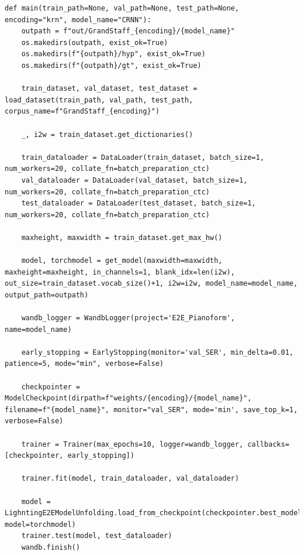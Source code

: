 \begin{lstlisting}[caption={Główna funkcja uczenia modelu}, label={model-main}]
def main(train_path=None, val_path=None, test_path=None, encoding="krn", model_name="CRNN"):
	outpath = f"out/GrandStaff_{encoding}/{model_name}"
	os.makedirs(outpath, exist_ok=True)
	os.makedirs(f"{outpath}/hyp", exist_ok=True)
	os.makedirs(f"{outpath}/gt", exist_ok=True)
	
	train_dataset, val_dataset, test_dataset = load_dataset(train_path, val_path, test_path, corpus_name=f"GrandStaff_{encoding}")
	
	_, i2w = train_dataset.get_dictionaries()
	
	train_dataloader = DataLoader(train_dataset, batch_size=1, num_workers=20, collate_fn=batch_preparation_ctc)
	val_dataloader = DataLoader(val_dataset, batch_size=1, num_workers=20, collate_fn=batch_preparation_ctc)
	test_dataloader = DataLoader(test_dataset, batch_size=1, num_workers=20, collate_fn=batch_preparation_ctc)
	
	maxheight, maxwidth = train_dataset.get_max_hw()
	
	model, torchmodel = get_model(maxwidth=maxwidth, maxheight=maxheight, in_channels=1, blank_idx=len(i2w), out_size=train_dataset.vocab_size()+1, i2w=i2w, model_name=model_name, output_path=outpath)
	
	wandb_logger = WandbLogger(project='E2E_Pianoform', name=model_name)
	
	early_stopping = EarlyStopping(monitor='val_SER', min_delta=0.01, patience=5, mode="min", verbose=False)
	
	checkpointer = ModelCheckpoint(dirpath=f"weights/{encoding}/{model_name}", filename=f"{model_name}", monitor="val_SER", mode='min', save_top_k=1, verbose=False)
	
	trainer = Trainer(max_epochs=10, logger=wandb_logger, callbacks=[checkpointer, early_stopping])
	
	trainer.fit(model, train_dataloader, val_dataloader)
	
	model = LighntingE2EModelUnfolding.load_from_checkpoint(checkpointer.best_model_path, model=torchmodel)
	trainer.test(model, test_dataloader)
	wandb.finish()
\end{lstlisting}













